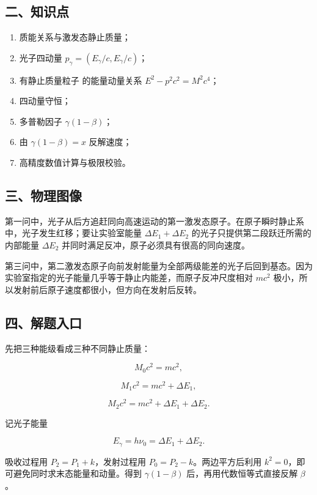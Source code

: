 \documentclass[12pt,a4paper,UTF8]{ctexart}
\newcommand{\tightlist}{\setlength{\itemsep}{0pt}\setlength{\parskip}{0pt}}
\begin{document}
\subsection{二、知识点}\label{ux4e8cux77e5ux8bc6ux70b9-7}

\begin{enumerate}
\def\labelenumi{\arabic{enumi}.}
\tightlist
\item
  质能关系与激发态静止质量；
\item
  光子四动量 \(p_\gamma=(E_\gamma/c,E_\gamma/c)\)；
\item
  有静止质量粒子 的能量动量关系 \(E^2-p^2c^2=M^2c^4\)；
\item
  四动量守恒；
\item
  多普勒因子 \(\gamma(1-\beta)\)；
\item
  由 \(\gamma(1-\beta)=x\) 反解速度；
\item
  高精度数值计算与极限校验。
\end{enumerate}

\subsection{三、物理图像}\label{ux4e09ux7269ux7406ux56feux50cf-7}

第一问中，光子从后方追赶同向高速运动的第一激发态原子。在原子瞬时静止系中，光子发生红移；要让实验室能量
\(\Delta E_1+\Delta E_2\) 的光子只提供第二段跃迁所需的内部能量
\(\Delta E_2\) 并同时满足反冲，原子必须具有很高的同向速度。

第三问中，第二激发态原子向前发射能量为全部两级能差的光子后回到基态。因为实验室指定的光子能量几乎等于静止内能差，而原子反冲尺度相对
\(mc^2\) 极小，所以发射前后原子速度都很小，但方向在发射后反转。

\subsection{四、解题入口}\label{ux56dbux89e3ux9898ux5165ux53e3-7}

先把三种能级看成三种不同静止质量：

\[
M_0c^2=mc^2,
\]

\[
M_1c^2=mc^2+\Delta E_1,
\]

\[
M_2c^2=mc^2+\Delta E_1+\Delta E_2.
\]

记光子能量

\[
E_\gamma=h\nu_0=\Delta E_1+\Delta E_2.
\]

吸收过程用 \(P_2=P_1+k\)，发射过程用 \(P_0=P_2-k\)。两边平方后利用
\(k^2=0\)，即可避免同时求末态能量和动量。得到 \(\gamma(1-\beta)\)
后，再用代数恒等式直接反解 \(\beta\)。
\end{document}
